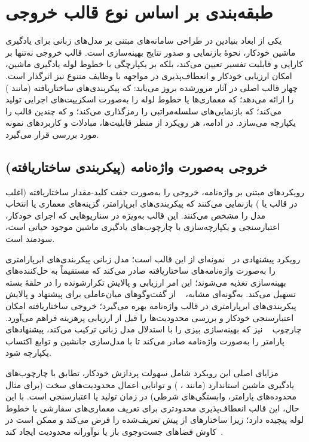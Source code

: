 
\section{طبقه‌بندی بر اساس نوع قالب خروجی}
یکی از ابعاد بنیادین در طراحی سامانه‌های مبتنی بر مدل‌های زبانی برای یادگیری ماشین خودکار، نحوهٔ بازنمایی و صدور نتایج بهینه‌سازی است. قالب خروجی نه‌تنها بر کارایی و قابلیت تفسیر تعیین می‌کند، بلکه بر یکپارچگی با خطوط لوله یادگیری ماشین، امکان ارزیابی خودکار و انعطاف‌پذیری در مواجهه با وظایف متنوع نیز اثرگذار است. چهار قالب اصلی در آثار مرورشده بروز می‌یابد:  که پیکربندی‌های ساختاریافته (مانند ) را ارائه می‌دهد؛  که معماری‌ها یا خطوط لوله را به‌صورت اسکریپت‌های اجرایی تولید می‌کند؛  که بازنمایی‌های سلسله‌مراتبی را رمزگذاری می‌کند؛ و  که چندین قالب را یکپارچه می‌سازد. در ادامه، هر رویکرد از منظر قابلیت‌ها، مبادلات و کاربردهای نمونه مورد بررسی قرار می‌گیرد.

\subsection{خروجی به‌صورت واژه‌نامه (پیکربندی ساختاریافته)}
رویکردهای مبتنی بر واژه‌نامه، خروجی را به‌صورت جفت کلید-مقدار ساختاریافته (اغلب در قالب  یا ) بازنمایی می‌کنند که پیکربندی‌های ابرپارامتر، گزینه‌های معماری یا انتخاب مدل را مشخص می‌کنند. این قالب به‌ویژه در سناریوهایی که اجرای خودکار، اعتبارسنجی و یکپارچه‌سازی با چارچوب‌های یادگیری ماشین موجود حیاتی است، سودمند است.

رویکرد پیشنهادی در~\cite{zhang2023usingLLMforHPO} نمونه‌ای از این قالب است؛ مدل زبانی پیکربندی‌های ابرپارامتری را به‌صورت واژه‌نامه‌های ساختاریافته صادر می‌کند که مستقیماً به حل‌کننده‌های بهینه‌سازی تغذیه می‌شوند؛ این امر ارزیابی و پالایش تکرارشونده را در حلقهٔ بسته تسهیل می‌کند. به‌گونه‌ای مشابه، ~\cite{liu2025agenthpo} از گفت‌وگوهای میان‌عاملی برای پیشنهاد و پالایش پیکربندی‌های ابرپارامتری در قالب واژه‌نامه بهره می‌گیرد؛ خروجی ساختاریافته امکان اعتبارسنجی خودکار و بررسی محدودیت‌ها را قبل از ارزیابی پرهزینه فراهم می‌آورد. چارچوب ~\cite{liu2024LLAMBO} نیز که بهینه‌سازی بیزی را با استدلال مدل زبانی ترکیب می‌کند، پیشنهادهای پارامتر را به‌صورت واژه‌نامه صادر می‌کند تا با مدل‌سازی جانشین و توابع اکتساب یکپارچه شود.

مزایای اصلی این رویکرد شامل سهولت پردازش خودکار، تطابق با چارچوب‌های یادگیری ماشین استاندارد (مانند ، ) و توانایی اعمال محدودیت‌های سخت (برای مثال محدوده‌های پارامتر، وابستگی‌های شرطی) در زمان تولید یا اعتبارسنجی است. با این حال، این قالب انعطاف‌پذیری محدودتری برای تعریف معماری‌های سفارشی یا خطوط لوله پیچیده دارد؛ زیرا ساختارهای از پیش تعریف‌شده را فرض می‌کند و ممکن است در کاوش فضاهای جست‌وجوی باز یا نوآورانه محدودیت ایجاد کند~\cite{zhang2023usingLLMforHPO,liu2025agenthpo}.

